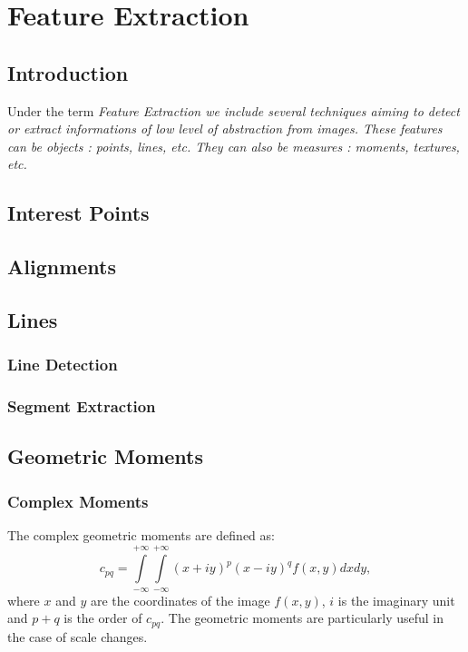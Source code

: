 \chapter{Feature Extraction}
\section{Introduction}
Under the term \em{Feature Extraction} we include several techniques
aiming to detect or extract informations of low level of abstraction
from images. These \em{features} can be objects : points, lines,
etc. They can also be measures : moments, textures, etc.


\section{Interest Points}

\section{Alignments}
\label{sec:Alignments}

\section{Lines}
\label{sec:LineDetectors}

\subsection{Line Detection}
\label{sec:LineDetection}




\subsection{Segment Extraction}
\label{sec:SegmentExtraction}

%
%

\section{Geometric Moments}

\subsection{Complex Moments}
\label{sec:ComplexMoments}
The complex geometric moments are defined as:
\begin {equation}
c_{pq} = \int\limits_{-\infty}^{+\infty}\int\limits_{-\infty}^{+\infty}(x + iy)^p(x- iy)^qf(x,y)dxdy,
\label{2.2}
\end{equation}
where $x$ and $y$ are the coordinates of the image $f(x,y)$, $i$ is the
imaginary unit and
$p+q$ is the order of $c_{pq}$. The geometric moments are
particularly useful in the case of scale changes.

